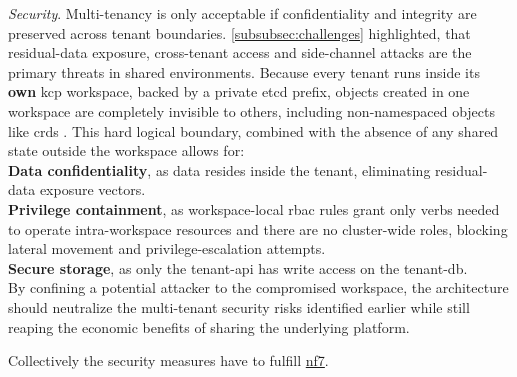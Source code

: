 \documentclass[11pt, a4paper, oneside, listof=totoc]{scrartcl}
\begin{document}
\begin{enumerate}[label={[\arabic*]:},
                    ref=Challenge~\arabic*,
                    leftmargin=*,
                    itemsep=0.6\baselineskip]
                    \item\label{chal:architectureSecurity}
                        \textit{Security}.
                        Multi-tenancy is only acceptable if confidentiality and integrity are
                        preserved across tenant boundaries.
                        \autoref{subsubsec:challenges} highlighted, that residual-data exposure,
                        cross-tenant access and side-channel attacks are the primary threats in
                        shared environments.
                        Because every tenant runs inside its \textbf{own} \gls{kcp} workspace,
                        backed by a private \gls{etcd} prefix, objects created in one workspace are
                        completely invisible to others, including non-namespaced objects like
                        \glspl{crd} \parencite{kcpWorkspaces}.
                        This hard logical boundary, combined with the absence of any shared state
                        outside the workspace allows for:
                        \\
                        \textbf{Data confidentiality}, as data resides inside the tenant,
                        eliminating residual-data exposure vectors.
                        \\
                        \textbf{Privilege containment}, as workspace-local \gls{rbac} rules grant
                        only verbs needed to operate intra-workspace resources and there are no
                        cluster-wide roles, blocking lateral movement and privilege-escalation
                        attempts.
                        \\
                        \textbf{Secure storage}, as only the tenant-\gls{api} has write access on
                        the tenant-\gls{db}.
                        \\
                        By confining a potential attacker to the compromised workspace, the
                        architecture should neutralize the multi-tenant security risks identified
                        earlier while still reaping the economic benefits of sharing the underlying
                        platform.
                        
                \end{enumerate}

                Collectively the security measures have to fulfill \hyperlink{NF-07}{nf7}.
                
                \cleardoublepage
\end{document}
